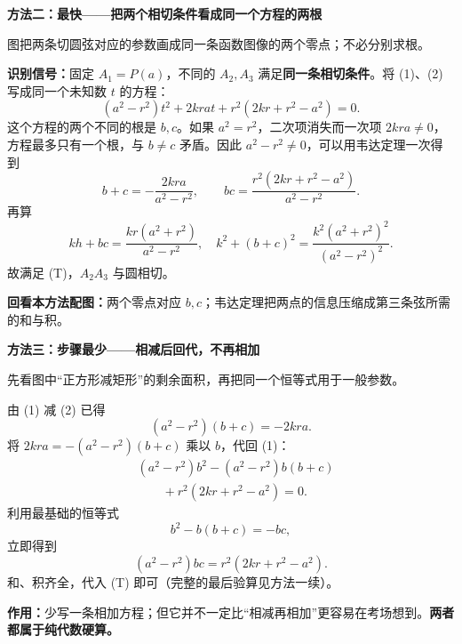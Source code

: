\clearpage
\begin{proofbox}
\textbf{\textcolor{CProof}{方法二：最快——把两个相切条件看成同一个方程的两根}}

\begin{center}

\end{center}
图把两条切圆弦对应的参数画成同一条函数图像的两个零点；不必分别求根。

\textbf{识别信号：}固定 $A_1=P(a)$，不同的 $A_2,A_3$ 满足\textbf{同一条相切条件}。将 (1)、(2) 写成同一个未知数 $t$ 的方程：
\[
(a^2-r^2)t^2+2krat+r^2(2kr+r^2-a^2)=0.
\]
这个方程的两个不同的根是 $b,c$。如果 $a^2=r^2$，二次项消失而一次项 $2kra\ne0$，方程最多只有一个根，与 $b\ne c$ 矛盾。因此 $a^2-r^2\ne0$，可以用韦达定理一次得到
\[
\boxed{b+c=-\frac{2kra}{a^2-r^2}},\qquad
\boxed{bc=\frac{r^2(2kr+r^2-a^2)}{a^2-r^2}}.
\]
再算
\[
kh+bc=\frac{kr(a^2+r^2)}{a^2-r^2},\quad
k^2+(b+c)^2=\frac{k^2(a^2+r^2)^2}{(a^2-r^2)^2}.
\]
故满足 (T)，$A_2A_3$ 与圆相切。

\textbf{回看本方法配图：}两个零点对应 $b,c$；韦达定理把两点的信息压缩成第三条弦所需的和与积。
\end{proofbox}

\clearpage
\begin{proofbox}
\textbf{\textcolor{CProof}{方法三：步骤最少——相减后回代，不再相加}}

\begin{center}

\end{center}
先看图中“正方形减矩形”的剩余面积，再把同一个恒等式用于一般参数。

由 (1) 减 (2) 已得
\[
(a^2-r^2)(b+c)=-2kra.
\]
将 $2kra=-(a^2-r^2)(b+c)$ 乘以 $b$，代回 (1)：
\[
\begin{aligned}
&(a^2-r^2)b^2-(a^2-r^2)b(b+c)\\
&\qquad+r^2(2kr+r^2-a^2)=0.
\end{aligned}
\]
利用最基础的恒等式
\[
\boxed{b^2-b(b+c)=-bc},
\]
立即得到
\[
(a^2-r^2)bc=r^2(2kr+r^2-a^2).
\]
和、积齐全，代入 (T) 即可（完整的最后验算见方法一续）。

\textbf{作用：}少写一条相加方程；但它并不一定比“相减再相加”更容易在考场想到。\textbf{两者都属于纯代数硬算。}
\end{proofbox}


